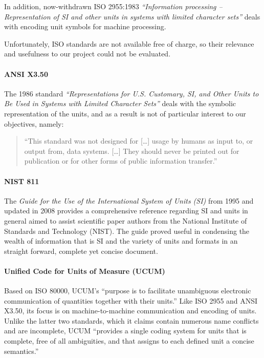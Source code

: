 In addition, now-withdrawn ISO 2955:1983 \emph{``Information processing
-- Representation of SI and other units in systems with limited
character sets''} deals with encoding unit symbols for machine
processing.

Unfortunately, ISO standards are not available free of charge, so their
relevance and usefulness to our project could not be evaluated.

\paragraph{ANSI X3.50}\label{ansi-x3.50}

The 1986 standard \emph{``Representations for U.S. Customary, SI, and
Other Units to Be Used in Systems with Limited Character Sets''} deals
with the symbolic representation of the units, and as a result is not of
particular interest to our objectives, namely:

\begin{quote}
``This standard was not designed for {[}\ldots{}{]} usage by humans as
input to, or output from, data systems. {[}\ldots{}{]} They should never
be printed out for publication or for other forms of public information
transfer.''
\end{quote}

\paragraph{NIST 811}\label{nist-811}

The \emph{Guide for the Use of the International System of Units (SI)}
from 1995 and updated in 2008 provides a comprehensive reference
regarding SI and units in general aimed to assist scientific paper
authors from the National Institute of Standards and Technology (NIST).
The guide proved useful in condensing the wealth of information that is
SI and the variety of units and formats in an straight forward, complete
yet concise document.

\paragraph{Unified Code for Units of Measure
(UCUM)}\label{unified-code-for-units-of-measure-ucum}

Based on ISO 80000, UCUM's ``purpose is to facilitate unambiguous
electronic communication of quantities together with their units.'' Like
ISO 2955 and ANSI X3.50, its focus is on machine-to-machine
communication and encoding of units. Unlike the latter two standards,
which it claims contain numerous name conflicts and are incomplete, UCUM
``provides a single coding system for units that is complete, free of
all ambiguities, and that assigns to each defined unit a concise
semantics.''

